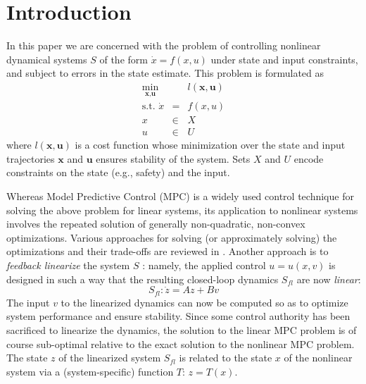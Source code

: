 \section{Introduction}
\label{sec:intro}

In this paper we are concerned with the problem of controlling nonlinear dynamical systems $S$ of the form $\dot{x} = f(x,u)$ under state and input constraints, and subject to errors in the state estimate.
This problem is formulated as
\begin{eqnarray}
	\label{eq:generic NLMPC}
	\min_{\textbf{x},\textbf{u}} &\;& l(\textbf{x}, \textbf{u}) \\
	\text{s.t. } \dot{x}&=&f(x,u) \nonumber \\
	x&\in& X  \nonumber\\
	u&\in& U  \nonumber
\end{eqnarray}
where $l(\textbf{x}, \textbf{u})$ is a cost function whose minimization over the state and input trajectories $\textbf{x}$ and $\textbf{u}$ ensures stability of the system. 
Sets $X$ and $U$ encode constraints on the state (e.g., safety) and the input.

Whereas Model Predictive Control (MPC) is a widely used control technique for solving the above problem for linear systems, its application to nonlinear systems involves the repeated solution of generally non-quadratic, non-convex optimizations.
Various approaches for solving (or approximately solving) the optimizations and their trade-offs are reviewed in \cite{Cannon04_EfficientMPC}.
Another approach is to \emph{feedback linearize} the system $S$ \cite{khalil}: namely, the applied control $u = u(x,v)$ is designed in such a way that the resulting closed-loop dynamics $S_{fl}$ are now \emph{linear}:
	\[S_{fl}: \dot{z} = Az + Bv\]
The input $v$ to the linearized dynamics can now be computed so as to optimize system performance and ensure stability.
Since some control authority has been sacrificed to linearize the dynamics, the solution to the linear MPC problem is of course sub-optimal relative to the exact solution to the nonlinear MPC problem.
The state $z$ of the linearized system $S_{fl}$ is related to the state $x$ of the nonlinear system via a (system-specific) function $T$: $z=T(x)$.

